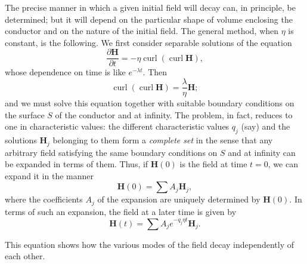 The precise manner in which a given initial field will decay can, in principle, be determined; but it will depend on the particular shape of volume enclosing the conductor and on the nature of the initial field. The general method, when $\eta$ is constant, is the following. We first consider separable solutions of the equation
\begin{equation}
\label{eq:4-23}
\frac{\partial\mathbf{H}}{\partial t} = -\eta\operatorname{curl}(\operatorname{curl}\mathbf{H}),
\end{equation}
whose dependence on time is like $e^{-\lambda t}$. Then
\begin{equation}
\label{eq:4-24}
\operatorname{curl}(\operatorname{curl}\mathbf{H}) = \frac{\lambda}{\eta}\mathbf{H};
\end{equation}
and we must solve this equation together with suitable boundary conditions on the surface $S$ of the conductor and at infinity. The problem, in fact, reduces to one in characteristic values: the different characteristic values $q_j$ (say) and the solutions $\mathbf{H}_j$ belonging to them form a \emph{complete set} in the sense that any arbitrary field satisfying the same boundary conditions on $S$ and at infinity can be expanded in terms of them. Thus, if $\mathbf{H}(0)$ is the field at time $t=0$, we can expand it in the manner
\begin{equation}
\label{eq:4-25}
\mathbf{H}(0) = \sum A_j \mathbf{H}_j,
\end{equation}
where the coefficients $A_j$ of the expansion are uniquely determined by $\mathbf{H}(0)$. In terms of such an expansion, the field at a later time is given by
\begin{equation}
\label{eq:4-26}
\mathbf{H}(t) = \sum A_j e^{-q_j\eta t}\mathbf{H}_j.
\end{equation}

This equation shows how the various modes of the field decay independently of each other.

